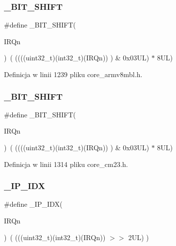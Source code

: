 \subsubsection{\texorpdfstring{\+\_\+\+B\+I\+T\+\_\+\+S\+H\+I\+FT}{\_BIT\_SHIFT}\hspace{0.1cm}{\footnotesize\ttfamily [5/6]}}
{\footnotesize\ttfamily \#define \+\_\+\+B\+I\+T\+\_\+\+S\+H\+I\+FT(\begin{DoxyParamCaption}\item[{}]{I\+R\+Qn }\end{DoxyParamCaption})~(  ((((uint32\+\_\+t)(int32\+\_\+t)(I\+R\+Qn))         )      \&  0x03\+U\+L) $\ast$ 8\+U\+L)}



Definicja w linii 1239 pliku core\+\_\+armv8mbl.\+h.

\mbox{\label{group___c_m_s_i_s___core___n_v_i_c_functions_ga53c75b28823441c6153269f0ecbed878}} 
\subsubsection{\texorpdfstring{\+\_\+\+B\+I\+T\+\_\+\+S\+H\+I\+FT}{\_BIT\_SHIFT}\hspace{0.1cm}{\footnotesize\ttfamily [6/6]}}
{\footnotesize\ttfamily \#define \+\_\+\+B\+I\+T\+\_\+\+S\+H\+I\+FT(\begin{DoxyParamCaption}\item[{}]{I\+R\+Qn }\end{DoxyParamCaption})~(  ((((uint32\+\_\+t)(int32\+\_\+t)(I\+R\+Qn))         )      \&  0x03\+U\+L) $\ast$ 8\+U\+L)}



Definicja w linii 1314 pliku core\+\_\+cm23.\+h.

\mbox{\label{group___c_m_s_i_s___core___n_v_i_c_functions_ga370ec4b1751a6a889d849747df3763a9}} 
\subsubsection{\texorpdfstring{\+\_\+\+I\+P\+\_\+\+I\+DX}{\_IP\_IDX}\hspace{0.1cm}{\footnotesize\ttfamily [1/6]}}
{\footnotesize\ttfamily \#define \+\_\+\+I\+P\+\_\+\+I\+DX(\begin{DoxyParamCaption}\item[{}]{I\+R\+Qn }\end{DoxyParamCaption})~(   (((uint32\+\_\+t)(int32\+\_\+t)(I\+R\+Qn))                $>$$>$    2\+U\+L)      )}



